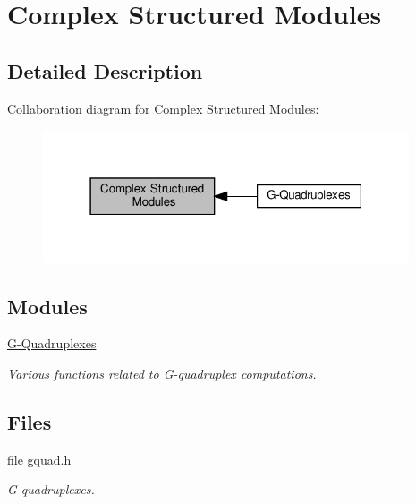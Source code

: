 \hypertarget{group__paired__modules}{}\section{Complex Structured Modules}
\label{group__paired__modules}


\subsection{Detailed Description}
Collaboration diagram for Complex Structured Modules\+:
\nopagebreak
\begin{figure}[H]
\begin{center}
\leavevmode
\includegraphics[width=307pt]{group__paired__modules}
\end{center}
\end{figure}
\subsection*{Modules}
\begin{DoxyCompactItemize}
\item 
\hyperlink{group__gquads}{G-\/\+Quadruplexes}
\begin{DoxyCompactList}\small\item\em Various functions related to G-\/quadruplex computations. \end{DoxyCompactList}\end{DoxyCompactItemize}
\subsection*{Files}
\begin{DoxyCompactItemize}
\item 
file \hyperlink{gquad_8h}{gquad.\+h}
\begin{DoxyCompactList}\small\item\em G-\/quadruplexes. \end{DoxyCompactList}\end{DoxyCompactItemize}
